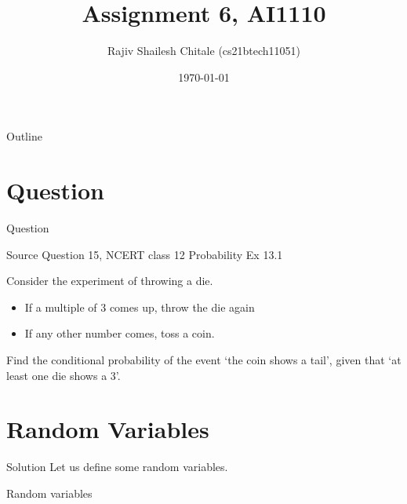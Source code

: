 \documentclass{beamer}
\begin{document}
\let\StandardTheFigure\thefigure
\let\vec\mathbf

\def\putbox#1#2#3{\makebox[0in][l]{\makebox[#1][l]{}\raisebox{\baselineskip}[0in][0in]{\raisebox{#2}[0in][0in]{#3}}}}
     \def\rightbox#1{\makebox[0in][r]{#1}}
     \def\centbox#1{\makebox[0in]{#1}}
     \def\topbox#1{\raisebox{-\baselineskip}[0in][0in]{#1}}
     \def\midbox#1{\raisebox{-0.5\baselineskip}[0in][0in]{#1}}
\vspace{3cm}


\title{Assignment 6, AI1110} 
\author{Rajiv Shailesh Chitale (cs21btech11051)}
\date{\today}
\logo{\large \LaTeX{}}
\begin{frame}
    \titlepage 
\end{frame}

\logo{}

\begin{frame}{Outline}
    \tableofcontents
\end{frame}
\section{Question}

\begin{frame}{Question}
     \begin{block}{Source}
        Question 15, NCERT class 12 Probability Ex 13.1 
    \end{block} 
    Consider the experiment of throwing a die.
    \begin{itemize}
        \item If a multiple of 3 comes up, throw the die again
        \item If any other number comes, toss a coin.
    \end{itemize}
     Find the conditional probability of the event \lq the coin shows a tail\rq, given that \lq at least one die shows a 3\rq.
\end{frame}

\section{Random Variables}
\begin{frame}{Solution}
    Let us define some random variables.
    \begin{table}[ht!]
        \centering
    	
        \caption{Random variables}
        \label{table:RandomVariables}	
    \end{table}
\end{frame}
\end{document}
